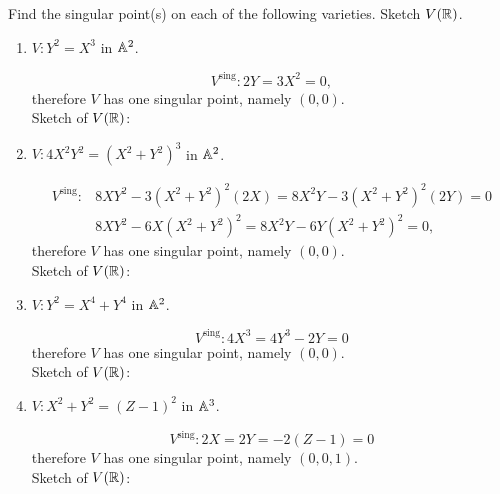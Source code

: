 \documentclass[12pt,reqno]{amsart}
\begin{document}
\begin{exe}
Find the singular point(s) on each of the following varieties. Sketch $V({\mathbb R})$.
\begin{enumerate}
\item $V: Y^2=X^3$ in ${\mathbb A}^2$.
\begin{solution}
\[
V^{\text{sing}}: 2Y=3X^2=0,
\]
therefore $V$ has one singular point, namely $(0, 0)$.\\
Sketch of $V({\mathbb R})$:
\end{solution}

\item $V: 4X^2 Y^2=(X^2+Y^2)^3$ in ${\mathbb A}^2$.
\begin{solution}
\begin{align*}
V^{\text{sing}}: &8XY^{2}-3(X^2+Y^2)^{2}(2X)=8X^{2}Y-3(X^2+Y^2)^2(2Y)=0\\
&8XY^2-6X(X^2+Y^2)^2=8X^2Y-6Y(X^2+Y^2)^2=0,
\end{align*}
therefore $V$ has one singular point, namely $(0, 0)$.\\
Sketch of $V({\mathbb R})$:
\end{solution}

\item $V: Y^2=X^4+Y^4$ in ${\mathbb A}^2$.
\begin{solution}
\[
V^{\text{sing}}: 4X^3=4Y^3-2Y=0
\]
therefore $V$ has one singular point, namely $(0, 0)$.\\
Sketch of $V({\mathbb R})$:
\end{solution}

\item $V: X^2+Y^2=(Z-1)^2$ in ${\mathbb A}^3$.
\begin{solution}
\[
V^{\text{sing}}: 2X=2Y=-2(Z-1)=0
\]
therefore $V$ has one singular point, namely $(0, 0, 1)$.\\
Sketch of $V({\mathbb R})$: 
\end{solution}
\end{enumerate}
\end{exe}
\end{document}
